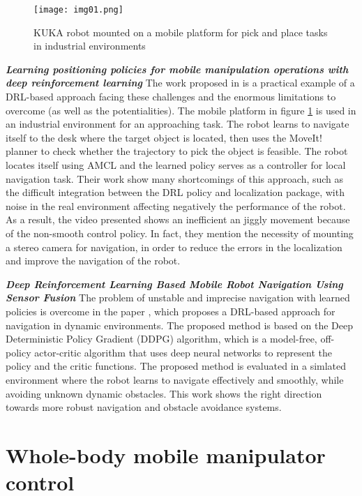 \begin{figure}[H]
	\centering
	\texttt{[image: img01.png]}
	\captionsetup{width=0.6\linewidth}
	\caption{KUKA robot mounted on a mobile platform for pick and place tasks
		in industrial environments \cite{liu2021deep}}
	\label{fig:img01}
\end{figure}


\textbf{\textit{Learning positioning policies for mobile manipulation operations
with deep reinforcement learning}}
\quad
The work proposed in \cite{liu2021deep} is a practical example of a DRL-based approach
facing these challenges and the enormous limitations to overcome (as well as the potentialities).
The mobile platform in figure \ref{fig:img01} is used in an industrial environment for an
approaching task. The robot learns to navigate itself to the desk where the target object is located,
then uses the MoveIt! planner to check whether the trajectory to pick the object is feasible.
The robot locates itself using AMCL and the learned policy serves as a controller for 
local navigation task. Their work show many shortcomings of this approach, such as the
difficult integration between the DRL policy and localization package, with noise in the
real environment affecting negatively the performance of the robot. As a result,
the video presented shows an inefficient an jiggly movement
because of the non-smooth control policy. In fact, they mention the necessity of mounting
a stereo camera for navigation, in order to reduce the errors in the localization and 
improve the navigation of the robot.

\textbf{\textit{Deep Reinforcement Learning Based Mobile Robot Navigation Using Sensor Fusion}} \quad
The problem of unstable and imprecise navigation with learned policies is overcome in the
paper \cite{yan2023drlnavigation}, which proposes a DRL-based approach for navigation in dynamic
environments. The proposed method is based on the Deep Deterministic Policy Gradient (DDPG)
algorithm, which is a model-free, off-policy actor-critic algorithm that uses deep neural networks
to represent the policy and the critic functions. The proposed method is evaluated in a
simlated environment where the robot learns to navigate effectively and smoothly, while avoiding
unknown dynamic obstacles. This work shows the right direction towards more robust
navigation and obstacle avoidance systems.

\section{Whole-body mobile manipulator control}

